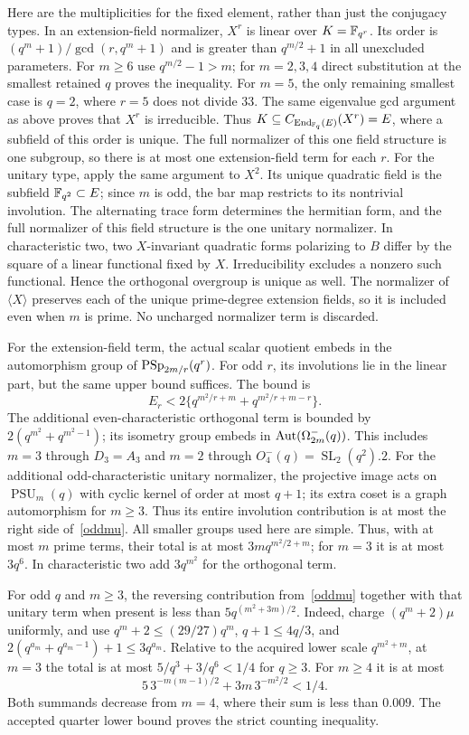 \documentclass[10pt]{article}
\begin{document}
Here are the multiplicities for the fixed element, rather than just the
conjugacy types. In an extension-field normalizer, $X^r$ is linear over
$K=\mathbb F_{q^r}$. Its order is $(q^m+1)/\gcd(r,q^m+1)$ and is greater than
$q^{m/2}+1$ in all unexcluded parameters. For $m\ge6$ use
$q^{m/2}-1>m$; for $m=2,3,4$ direct substitution at the smallest retained
$q$ proves the inequality. For $m=5$, the only remaining smallest case is
$q=2$, where $r=5$ does not divide $33$. The same eigenvalue gcd argument
as above proves that $X^r$ is irreducible. Thus
$K\subseteq C_{\operatorname{End}_{\mathbb F_q}(E)}(X^r)=E$, where a subfield of
this order is unique. The full normalizer of this one field structure is
one subgroup, so there is at most one extension-field term for each $r$.
For the unitary type, apply the same argument to $X^2$. Its unique
quadratic field is the subfield $\mathbb F_{q^2}\subset E$; since $m$ is odd,
the bar map restricts to its nontrivial involution. The alternating trace
form determines the hermitian form, and the full normalizer of this field
structure is the one unitary normalizer. In characteristic two, two
$X$-invariant quadratic forms polarizing to $B$ differ by the square of a
linear functional fixed by $X$. Irreducibility excludes a nonzero such
functional. Hence the orthogonal overgroup is unique as well.
The normalizer of $\langle X\rangle$ preserves each of the unique
prime-degree extension fields, so it is included even when $m$ is prime.
No uncharged normalizer term is discarded.

For the extension-field term, the actual scalar quotient embeds in the
automorphism group of $\operatorname{PSp}_{2m/r}(q^r)$. For odd $r$, its involutions lie
in the linear part, but the same upper bound suffices. The bound is
\[
 E_r<2\{q^{m^2/r+m}+q^{m^2/r+m-r}\}.
\]
The additional even-characteristic orthogonal term is bounded by
$2(q^{m^2}+q^{m^2-1})$; its isometry group embeds in
$\operatorname{Aut}(\Omega^-_{2m}(q))$. This includes $m=3$ through $D_3=A_3$ and
$m=2$ through $O^-_4(q)=\operatorname{SL}_2(q^2).2$.
For the additional odd-characteristic unitary normalizer, the projective
image acts on $\operatorname{PSU}_m(q)$ with cyclic kernel of order at most
$q+1$; its extra coset is a graph automorphism for $m\ge3$. Thus its entire
involution contribution is at most the right side of~\eqref{oddmu}.
All smaller groups used here are simple. Thus, with at most $m$ prime
terms, their total is at most $3m q^{m^2/2+m}$; for $m=3$ it is at most
$3q^6$. In characteristic two add $3q^{m^2}$ for the orthogonal term.

For odd $q$ and $m\ge3$, the reversing contribution from~\eqref{oddmu}
together with that unitary term when present is less than
$5q^{(m^2+3m)/2}$. Indeed, charge $(q^m+2)\mu$ uniformly, and use
$q^m+2\le(29/27)q^m$, $q+1\le4q/3$, and
$2(q^{a_m}+q^{a_m-1})+1\le3q^{a_m}$.
Relative to the acquired lower scale
$q^{m^2+m}$, at $m=3$ the total is at most
$5/q^3+3/q^6<1/4$ for $q\ge3$. For $m\ge4$ it is at most
\[
 5\,3^{-m(m-1)/2}+3m\,3^{-m^2/2}<1/4.
\]
Both summands decrease from $m=4$, where their sum is less than $0.009$.
The accepted quarter lower bound proves the strict counting inequality.
\end{document}
